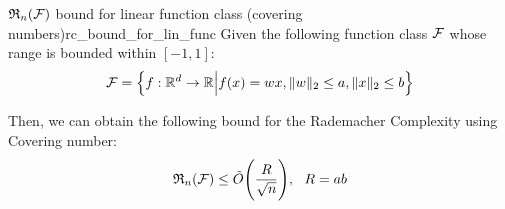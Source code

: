 \begin{proposition}{$\mathfrak{R}_n(\mathcal{F})$ bound for linear function class (covering numbers)}{rc_bound_for_lin_func}
    Given the following function class $\mathcal{F}$ whose range is bounded within $[-1, 1]$:
    \begin{align*}
        \mathcal{F} = \Big\{ 
            f:\mathbb{R}^d\to\mathbb{R} \Big| f(x) = wx, \|w\|_2 \le a, \|x\|_2 \le b
         \Big\}
    \end{align*}

    \noindent Then, we can obtain the following bound for the Rademacher Complexity using Covering number:
    \begin{align*}
        \mathfrak{R}_n(\mathcal{F}) \le \tilde O \Bigg( \frac{R}{\sqrt{n}} \Bigg), \ \ R = ab
    \end{align*}
\end{proposition}

